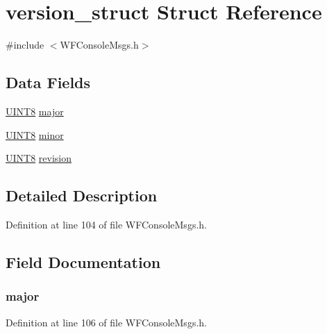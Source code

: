 \hypertarget{structversion__struct}{}\section{version\+\_\+struct Struct Reference}
\label{structversion__struct}


{\ttfamily \#include $<$W\+F\+Console\+Msgs.\+h$>$}

\subsection*{Data Fields}
\begin{DoxyCompactItemize}
\item 
\hyperlink{_generic_type_defs_8h_ab27e9918b538ce9d8ca692479b375b6a}{U\+I\+N\+T8} \hyperlink{structversion__struct_aecd30f62be9496c3478be7be07620023}{major}
\item 
\hyperlink{_generic_type_defs_8h_ab27e9918b538ce9d8ca692479b375b6a}{U\+I\+N\+T8} \hyperlink{structversion__struct_a775bf6899fe42c57201f6f5f3b99cb0a}{minor}
\item 
\hyperlink{_generic_type_defs_8h_ab27e9918b538ce9d8ca692479b375b6a}{U\+I\+N\+T8} \hyperlink{structversion__struct_abc3c99eba20b9459d3be0dd0ad8bf0e3}{revision}
\end{DoxyCompactItemize}


\subsection{Detailed Description}


Definition at line 104 of file W\+F\+Console\+Msgs.\+h.



\subsection{Field Documentation}
\hypertarget{structversion__struct_aecd30f62be9496c3478be7be07620023}{}
\subsubsection[{major}]{ major}\label{structversion__struct_aecd30f62be9496c3478be7be07620023}


Definition at line 106 of file W\+F\+Console\+Msgs.\+h.


